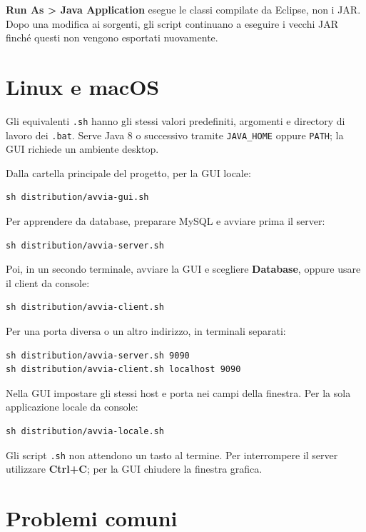 \documentclass[11pt,a4paper]{article}
\begin{document}
\textbf{Run As > Java Application} esegue le classi compilate da Eclipse,
non i JAR. Dopo una modifica ai sorgenti, gli script continuano a eseguire i
vecchi JAR finché questi non vengono esportati nuovamente.

\clearpage
\section*{Linux e macOS}

Gli equivalenti \texttt{.sh} hanno gli stessi valori predefiniti, argomenti e
directory di lavoro dei \texttt{.bat}. Serve Java 8 o successivo tramite
\texttt{JAVA\_HOME} oppure \texttt{PATH}; la GUI richiede un ambiente desktop.

Dalla cartella principale del progetto, per la GUI locale:
\begin{lstlisting}
sh distribution/avvia-gui.sh
\end{lstlisting}
Per apprendere da database, preparare MySQL e avviare prima il server:
\begin{lstlisting}
sh distribution/avvia-server.sh
\end{lstlisting}
Poi, in un secondo terminale, avviare la GUI e scegliere \textbf{Database},
oppure usare il client da console:
\begin{lstlisting}
sh distribution/avvia-client.sh
\end{lstlisting}
Per una porta diversa o un altro indirizzo, in terminali separati:
\begin{lstlisting}
sh distribution/avvia-server.sh 9090
sh distribution/avvia-client.sh localhost 9090
\end{lstlisting}
Nella GUI impostare gli stessi host e porta nei campi della finestra.
Per la sola applicazione locale da console:
\begin{lstlisting}
sh distribution/avvia-locale.sh
\end{lstlisting}
Gli script \texttt{.sh} non attendono un tasto al termine. Per interrompere
il server utilizzare \textbf{Ctrl+C}; per la GUI chiudere la finestra grafica.

\section*{Problemi comuni}
\end{document}
